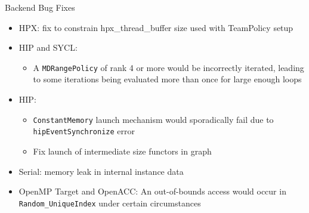 \begin{frame}[fragile]{Backend Bug Fixes}
    \begin{itemize}
        \item HPX: fix to constrain hpx\_thread\_buffer size used with TeamPolicy setup %
        \item HIP and SYCL:
        \begin{itemize}
          \item A \texttt{MDRangePolicy} of rank 4 or more would be incorrectly iterated, leading to some iterations being evaluated more than once for large enough loops %
        \end{itemize}
        \item HIP:
        \begin{itemize}
          \item \texttt{ConstantMemory} launch mechanism would sporadically fail due to \texttt{hipEventSynchronize} error %
          \item Fix launch of intermediate size functors in graph %
        \end{itemize}
        \item Serial: memory leak in internal instance data %
        \item OpenMP Target and OpenACC: An out-of-bounds access would occur in \texttt{Random\_UniqueIndex} under certain circumstances %
    \end{itemize}
\end{frame}



